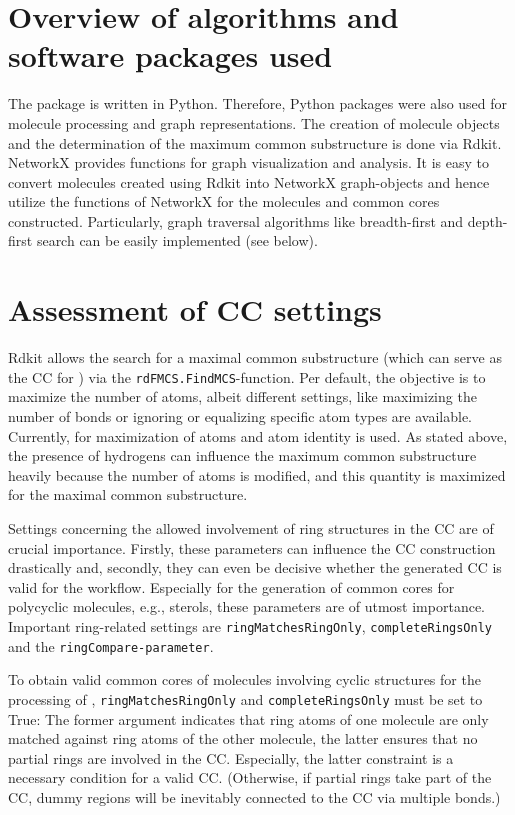 \section{Overview of algorithms and software packages used}

The {\trafo} package is written in Python. Therefore, Python packages
were also used for molecule processing and graph representations.
The creation of molecule objects and the determination of the maximum
common substructure is done via Rdkit\cite{key-3}. NetworkX\cite{AricA.Hagberg.2008}
provides functions for graph visualization and analysis. It is easy to convert molecules created using Rdkit into NetworkX graph-objects
and hence utilize the functions of NetworkX for the molecules and
common cores constructed. Particularly, graph traversal algorithms
like breadth-first and depth-first search can be easily implemented
(see below).

\section{Assessment of CC settings}

Rdkit allows the search for a maximal common substructure (which can
serve as the CC for {\trafo}) via the \texttt{rdFMCS.FindMCS}-function.
Per default, the objective is to maximize the number of atoms, albeit
different settings, like maximizing the number of bonds or ignoring
or equalizing specific atom types are available. Currently, for
{\trafo} maximization of atoms and atom identity is used. As stated above, the presence of hydrogens can influence
the maximum common substructure heavily because the number of atoms is modified, and this quantity is maximized for the maximal common substructure. 

Settings concerning the allowed involvement of ring structures in
the CC are of crucial importance. Firstly, these parameters
can influence the CC construction drastically and, secondly, they
can even be decisive whether the generated CC is valid for the
{\trafo} workflow.
Especially for the generation of common cores for polycyclic molecules, e.g., sterols, these parameters are of utmost importance.  
Important ring-related settings are \texttt{ringMatchesRingOnly}, \texttt{completeRingsOnly}
and the \texttt{ringCompare-parameter}. 

To obtain valid common cores of molecules involving cyclic structures for the processing of {\trafo}, \texttt{ringMatchesRingOnly}
and \texttt{completeRingsOnly} must be set to True: The former argument indicates
that ring atoms of one molecule are only matched against ring atoms
of the other molecule, the latter ensures that no partial rings are
involved in the CC. Especially, the latter constraint is a
necessary condition for a valid CC. (Otherwise, if partial
rings take part of the CC, dummy regions will be inevitably
connected to the CC via multiple bonds.)

